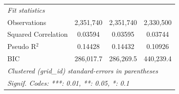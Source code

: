 \begin{tabular}{lccc}
   \midrule
   \emph{Fit statistics}\\
   Observations                                                                    & 2,351,740       & 2,351,740            & 2,330,500\\  
   Squared Correlation                                                             & 0.03594         & 0.03595              & 0.03744\\  
   Pseudo R$^2$                                                                    & 0.14428         & 0.14432              & 0.10926\\  
   BIC                                                                             & 286,017.7       & 286,269.5            & 440,239.4\\  
   \midrule \midrule
   \multicolumn{4}{l}{\emph{Clustered (grid\_id) standard-errors in parentheses}}\\
   \multicolumn{4}{l}{\emph{Signif. Codes: ***: 0.01, **: 0.05, *: 0.1}}\\
\end{tabular}
\par\endgroup


